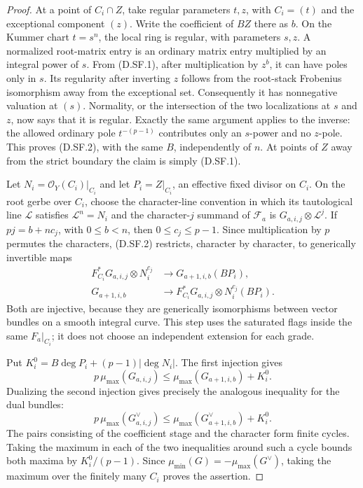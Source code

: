 \begin{proof}
At a point of $C_i\cap Z$, take regular parameters
$t,z$, with $C_i=(t)$ and the exceptional component
$(z)$.  Write the coefficient of $BZ$ there as $b$.
On the Kummer chart $t=s^n$, the local ring is regular,
with parameters $s,z$.  A normalized root-matrix entry
is an ordinary matrix entry multiplied by an integral
power of $s$.  From (D.SF.1), after multiplication by
$z^b$, it can have poles only in $s$.  Its regularity
after inverting $z$ follows from the root-stack
Frobenius isomorphism away from the exceptional set.
Consequently it has nonnegative valuation at $(s)$.
Normality, or the intersection of the two localizations
at $s$ and $z$, now says that it is regular.
Exactly the same argument applies to the inverse:
the allowed ordinary pole $t^{-(p-1)}$ contributes
only an $s$-power and no $z$-pole.  This proves
(D.SF.2), with the same $B$, independently of $n$.
At points of $Z$ away from the strict boundary the
claim is simply (D.SF.1).

Let $N_i=\mathcal O_Y(C_i)|_{C_i}$ and let
$P_i=Z|_{C_i}$, an effective fixed divisor on $C_i$.
On the root gerbe over $C_i$, choose the character-line
convention in which its tautological line $\mathcal L$
satisfies $\mathcal L^n=N_i$ and the character-$j$
summand of $\mathcal F_a$ is
$G_{a,i,j}\otimes\mathcal L^j$.
If $pj=b+nc_j$, with $0\le b<n$, then
$0\le c_j\le p-1$.  Since multiplication by $p$ permutes
the characters, (D.SF.2) restricts, character by
character, to generically invertible maps
\[
 \begin{split}
 F_{C_i}^*G_{a,i,j}\otimes N_i^{c_j}
        &\longrightarrow G_{a+1,i,b}(BP_i),\\
 G_{a+1,i,b}
        &\longrightarrow
        F_{C_i}^*G_{a,i,j}\otimes N_i^{c_j}(BP_i).
 \end{split}                                            \tag{D.SF.3}
\]
Both are injective, because they are generically
isomorphisms between vector bundles on a smooth
integral curve.  This step uses the saturated flags
inside the same $F_a|_{C_i}$; it does not choose an
independent extension for each grade.

Put $K_i^0=B\deg P_i+(p-1)|\deg N_i|$.
The first injection gives
\[
 p\,\mu_{\max}(G_{a,i,j})
              \le\mu_{\max}(G_{a+1,i,b})+K_i^0.
\]
Dualizing the second injection gives precisely
the analogous inequality for the dual bundles:
\[
 p\,\mu_{\max}(G_{a,i,j}^{\vee})
              \le\mu_{\max}(G_{a+1,i,b}^{\vee})+K_i^0.
\]
The pairs consisting of the coefficient stage and
the character form finite cycles.  Taking the
maximum in each of the two inequalities around
such a cycle bounds both maxima by $K_i^0/(p-1)$.
Since $\mu_{\min}(G)=-\mu_{\max}(G^\vee)$, taking
the maximum over the finitely many $C_i$ proves
the assertion.
\end{proof}

